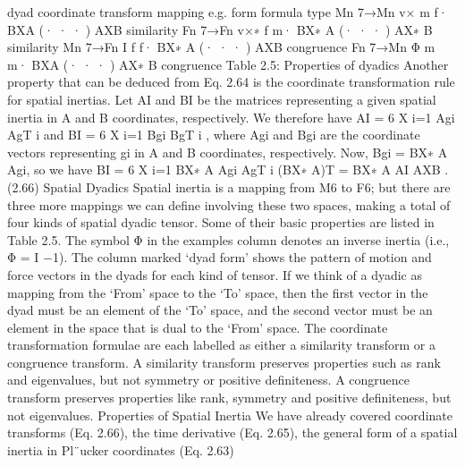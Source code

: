 dyad coordinate transform mapping e.g. form formula type Mn 7→Mn v× m f· BXA (· · · ) AXB similarity Fn 7→Fn v×∗ f m· BX∗ A (· · · ) AX∗ B similarity Mn 7→Fn I f f· BX∗ A (· · · ) AXB congruence Fn 7→Mn Φ m m· BXA (· · · ) AX∗ B congruence Table 2.5: Properties of dyadics Another property that can be deduced from Eq. 2.64 is the coordinate transformation rule for spatial inertias. Let AI and BI be the matrices representing a given spatial inertia in A and B coordinates, respectively. We therefore have AI = 6 X i=1 Agi AgT i and BI = 6 X i=1 Bgi BgT i , where Agi and Bgi are the coordinate vectors representing gi in A and B coordinates, respectively. Now, Bgi = BX∗ A Agi, so we have BI = 6 X i=1 BX∗ A Agi AgT i (BX∗ A)T = BX∗ A AI AXB . (2.66) Spatial Dyadics Spatial inertia is a mapping from M6 to F6; but there are three more mappings we can define involving these two spaces, making a total of four kinds of spatial dyadic tensor. Some of their basic properties are listed in Table 2.5. The symbol Φ in the examples column denotes an inverse inertia (i.e., Φ = I −1). The column marked ‘dyad form’ shows the pattern of motion and force vectors in the dyads for each kind of tensor. If we think of a dyadic as mapping from the ‘From’ space to the ‘To’ space, then the first vector in the dyad must be an element of the ‘To’ space, and the second vector must be an element in the space that is dual to the ‘From’ space. The coordinate transformation formulae are each labelled as either a similarity transform or a congruence transform. A similarity transform preserves properties such as rank and eigenvalues, but not symmetry or positive definiteness. A congruence transform preserves properties like rank, symmetry and positive definiteness, but not eigenvalues. Properties of Spatial Inertia We have already covered coordinate transforms (Eq. 2.66), the time derivative (Eq. 2.65), the general form of a spatial inertia in Pl¨ucker coordinates (Eq. 2.63)

